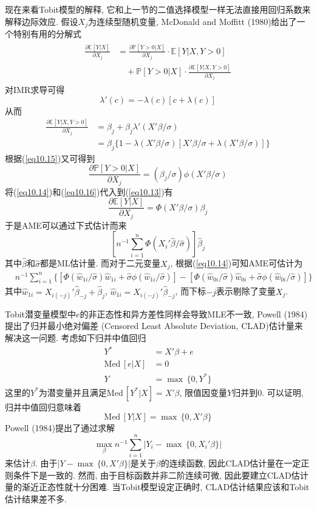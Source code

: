 \documentclass[cn, 12pt, math=mtpro2, bibstyle=apa, blue, twocol]{elegantbook}
\newcommand{\E}{\mathbb{E}}
\newcommand{\PP}{\mathbb{P}}
\newcommand{\hb}{\hat{\beta}}
\begin{document}
现在来看Tobit模型的解释, 它和上一节的二值选择模型一样无法直接用回归系数来解释边际效应. 假设$X_j$为连续型随机变量, McDonald and Moffitt (1980)给出了一个特别有用的分解式
\begin{align}
\begin{split}
  \frac{\partial \E[Y|X]}{\partial X_j}&=\frac{\partial \PP[Y>0|X]}{\partial X_j}\cdot\E[Y|X,Y>0]\\
  &\quad +\PP[Y>0|X]\cdot\frac{\partial \E[Y|X,Y>0]}{\partial X_j}
\end{split}
\label{eq10.13}
\end{align}
对IMR求导可得
$$\lambda'(c)=-\lambda(c)[c+\lambda(c)]$$
从而
\begin{align}
\frac{\partial \E[Y|X,Y>0]}{\partial X_j}&=\beta_j+\beta_j\lambda'(X'\beta/\sigma) \nonumber \\
&=\beta_j\{1-\lambda(X'\beta/\sigma)[X'\beta/\sigma+\lambda(X'\beta/\sigma)]\} \label{eq10.14}
\end{align}
根据(\ref{eq10.15})又可得到
\begin{equation}\label{eq10.16}
  \frac{\partial\PP[Y>0|X]}{\partial X_j}=(\beta_j/\sigma)\phi(X'\beta/\sigma)
\end{equation}
将(\ref{eq10.14})和(\ref{eq10.16})代入到(\ref{eq10.13})有
$$\frac{\partial\E[Y|X]}{\partial X_j}=\Phi(X'\beta/\sigma)\beta_j$$
于是AME可以通过下式估计而来
$$\left[n^{-1}\sum_{i=1}^{n}\Phi(X_i'\hb/\hat{\sigma})\right]\hat{\beta}_j$$
其中$\hb$和$\hat{\sigma}$都是ML估计量. 而对于二元变量$X_j$, 根据(\ref{eq10.14})可知AME可估计为
\begin{align*}
&n^{-1}\sum_{i=1}^{n}\{[\Phi(\hat{w}_{1i}/\hat{\sigma})\hat{w}_{1i}+\hat{\sigma}\phi(\hat{w}_{1i}/\hat{\sigma})] -[\Phi(\hat{w}_{0i}/\hat{\sigma})\hat{w}_{0i}+\hat{\sigma}\phi(\hat{w}_{0i}/\hat{\sigma})]\}
\end{align*}
其中$\hat{w}_{1i}=X_{i(-j)}'\hb_{-j}+\hb_j$, $\hat{w}_{1i}=X_{i(-j)}'\hb_{-j}$, 而下标$-j$表示剔除了变量$X_j$.

Tobit潜变量模型中$e$的非正态性和异方差性同样会导致MLE不一致, Powell (1984)提出了归并最小绝对偏差 (Censored Least Absolute Deviation, CLAD)估计量来解决这一问题. 考虑如下归并中值回归
\begin{align*}
Y^\ast&=X'\beta+e \\
\text{Med}\,[e|X]&=0 \\
Y&=\max\,\{0,Y^\ast\}
\end{align*}
这里的$Y^\ast$为潜变量并且满足$\text{Med}\,[Y^\ast|X]=X'\beta$, 限值因变量$Y$归并到0. 可以证明, 归并中值回归意味着
$$\text{Med}\,[Y|X]=\max\,\{0,X'\beta\}$$
Powell (1984)提出了通过求解
$$\max_\beta n^{-1}\sum_{i=1}^{n}|Y_i-\max\,\{0,X_i'\beta\}|$$
来估计$\beta$. 由于$|Y-\max\,\{0,X'\beta\}|$是关于$\beta$的连续函数, 因此CLAD估计量在一定正则条件下是一致的. 然而, 由于目标函数并非二阶连续可微, 因此要建立CLAD估计量的渐近正态性就十分困难. 当Tobit模型设定正确时, CLAD估计结果应该和Tobit估计结果差不多.
\end{document}
